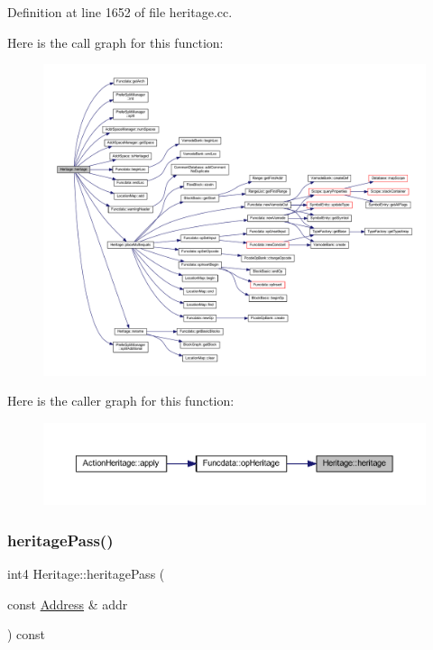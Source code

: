 Definition at line 1652 of file heritage.\+cc.

Here is the call graph for this function\+:
\nopagebreak
\begin{figure}[H]
\begin{center}
\leavevmode
\includegraphics[width=350pt]{class_heritage_ad710084ce475a863e5d5d800300e3fd8_cgraph}
\end{center}
\end{figure}
Here is the caller graph for this function\+:
\nopagebreak
\begin{figure}[H]
\begin{center}
\leavevmode
\includegraphics[width=350pt]{class_heritage_ad710084ce475a863e5d5d800300e3fd8_icgraph}
\end{center}
\end{figure}
\mbox{\label{class_heritage_a0a0dc0ad60e23c2901675abf1e1371ac}} 
\subsubsection{\texorpdfstring{heritagePass()}{heritagePass()}}
{\footnotesize\ttfamily int4 Heritage\+::heritage\+Pass (\begin{DoxyParamCaption}\item[{const \mbox{\hyperlink{class_address}{Address}} \&}]{addr }\end{DoxyParamCaption}) const\hspace{0.3cm}{\ttfamily [inline]}}



